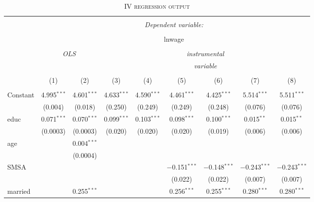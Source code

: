 \documentclass[a4paper]{article}
\begin{document}
\begin{table}[!htbp] \centering 
\begin{adjustwidth}{0.cm}{-0cm}
\begin{threeparttable}
\small
\captionsetup{font=small, justification=raggedright,singlelinecheck=false}
\caption{\textsc{IV regression output}}
\centering 
  \label{}
\small 
\begin{tabular}{@{\extracolsep{-5pt}}lcccccccc} 
\\[-5.8ex]\hline 
\hline \\[-1.8ex] 
 & \multicolumn{8}{c}{\textit{Dependent variable:}} \\ 
\cline{2-9} 
\\[-1.8ex] & \multicolumn{8}{c}{lnwage} \\ 
\\[-1.8ex] & \multicolumn{2}{c}{\textit{OLS}} & \multicolumn{6}{c}{\textit{instrumental}} \\ 
 & \multicolumn{2}{c}{\textit{}} & \multicolumn{6}{c}{\textit{variable}} \\ 
\\[-1.8ex] & (1) & (2) & (3) & (4) & (5) & (6) & (7) & (8)\\ 
\hline \\[-1.8ex] 
 Constant & 4.995$^{***}$ & 4.601$^{***}$ & 4.633$^{***}$ & 4.590$^{***}$ & 4.461$^{***}$ & 4.425$^{***}$ & 5.514$^{***}$ & 5.511$^{***}$ \\ 
  & (0.004) & (0.018) & (0.250) & (0.249) & (0.249) & (0.248) & (0.076) & (0.076) \\ 
  educ & 0.071$^{***}$ & 0.070$^{***}$ & 0.099$^{***}$ & 0.103$^{***}$ & 0.098$^{***}$ & 0.100$^{***}$ & 0.015$^{**}$ & 0.015$^{**}$ \\ 
  & (0.0003) & (0.0003) & (0.020) & (0.020) & (0.020) & (0.019) & (0.006) & (0.006) \\ 
  age &  & 0.004$^{***}$ &  &  &  &  &  &  \\ 
  &  & (0.0004) &  &  &  &  &  &  \\ 
  SMSA &  &  &  &  & $-$0.151$^{***}$ & $-$0.148$^{***}$ & $-$0.243$^{***}$ & $-$0.243$^{***}$ \\ 
  &  &  &  &  & (0.022) & (0.022) & (0.007) & (0.007) \\ 
  married &  & 0.255$^{***}$ &  &  & 0.256$^{***}$ & 0.255$^{***}$ & 0.280$^{***}$ & 0.280$^{***}$ \\ 

\end{tabular}
\end{threeparttable}
\end{adjustwidth}
\end{table}
\end{document}
